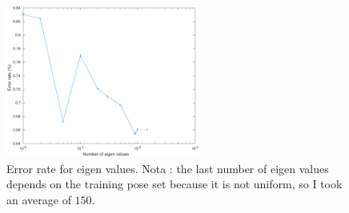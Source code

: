 \documentclass[runningheads,a4paper]{llncs}
\begin{document}
\begin{figure}
\centering
\includegraphics[height=5cm]{Figures/error_rate_eig_pose}
\caption{Error rate for eigen values. Nota : the last number of eigen values depends on the training pose set because it is not uniform, so I took an average of $150$. }
\label{fig:error_rate_eig_pose}
\end{figure}
\end{document}
